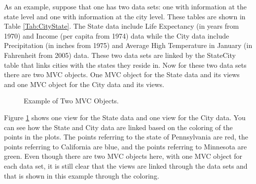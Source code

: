 \documentclass{article}[11pt]
\begin{document}
\normalsize
As an example, suppose that one has two data sets: one with information at the
state level and one with information at the city level.  These tables are
shown in Table \ref{Tab:CityState}.  The State data include Life Expectancy
(in years from 1970) and Income (per capita from 1974) data
while the City data include Precipitation (in inches from 1975) and Average
High Temperature in January (in Fahrenheit from 2005)
data.  These two data sets are linked by the StateCity table that links cities
with the states they reside in.  Now for these two data sets there are
two MVC objects.  One MVC object for the State data and its views and one MVC
object for the City data and its views. 

\begin{figure}[ht]
  \begin{center}
    \caption{ Example of Two MVC Objects. }
    \label{Fig:MultMVC}
  \end{center}
\end{figure}

Figure \ref{Fig:MultMVC} shows one view for the State data and one view
for the City data.  You can see how the State and City data are linked based
on the coloring of the points in the plots.  The points referring to the state
of Pennsylvania are red, the points referring to California are blue, and the
points referring to Minnesota are green.  Even though there are two MVC
objects here, with one MVC object for each data set, it is still clear that
the views are linked through the data sets and that is shown in this example
through the coloring.
\end{document}
